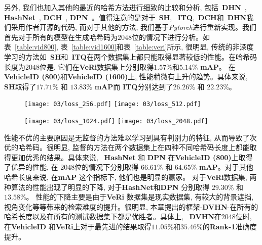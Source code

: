 另外, 我们也加入其他的最近的哈希方法进行细致的比较和分析, 包括~\textbf{DHN}~\cite{zhu2016deep}, \textbf{HashNet}~\cite{cao2017hashnet}, \textbf{DCH}~\cite{cao2018deep}, \textbf{DPN}~\cite{fan2020deep}。值得注意的是对于~\textbf{SH}, ~\textbf{ITQ},~\textbf{DCH}和~\textbf{DHN}我们采用作者开源的代码, 而对于其他的方法, 我们基于\textit{Pytorch}进行重新实现。我们首先对于所有的模型在生成哈希码为$2048$位的情况下进行分析。如表~\ref{table:vid800}, 表~\ref{table:vid1600}和表~\ref{table:veri}所示, 很明显, 传统的非深度学习的方法如~\textbf{SH}和~\textbf{ITQ}在两个数据集上都只能取得显著较低的性能。在哈希码长度为$2048$位是, 它们在\textbf{VeRi}数据集上分别取得$1.57\%$和$5.14\%$ \textbf{mAP}。 在\textbf{VehicleID (800)}和\textbf{VehicleID (1600)}上, 性能稍微有上升的趋势。具体来说, \textbf{SH}取得了$17.71 \%$ 和 $13.83 \%$ \textbf{mAP}而 \textbf{ITQ}分别达到了$26.26 \%$ 和 $22.23\%$。
\begin{figure}[!htp]
    \centering
    \texttt{[image: 03/loss\_256.pdf]}
    \hspace{1cm}
    \texttt{[image: 03/loss\_512.pdf]}
    \label{fig:losscurve}
  \end{figure}

  \begin{figure}[!htp]
    \centering
    \texttt{[image: 03/loss\_1024.pdf]}
    \hspace{1cm}
    \texttt{[image: 03/loss\_2048.pdf]}
    \label{fig:losscurve1}
  \end{figure}


性能不优的主要原因是无监督的方法难以学习到具有判别力的特征, 从而导致了次优的哈希码。很明显, 监督的方法在两个数据集上在四种不同哈希码长度上都能取得更加优秀的结果。具体来说, ~\textbf{HashNet} 和 \textbf{DPN} 在\textbf{VehicleID (800)}上取得了优异的性能, 在 $2048$位的情况下分别取得 $66.61 \%$ 和 $64.65 \%$ \textbf{mAP}。对于其他哈希长度来说, 在\textbf{mAP} 这个指标下, 他们也是明显的赢家。 对于\textbf{VeRi}数据集, 两种算法的性能出现了明显的下降, 对于\textbf{HashNet}和\textbf{DPN} 分别取得 $29.30\%$ 和$13.58\%$。 性能的下降主要是由于\textbf{VeRi} 数据集是现实数据集, 有较大的背景遮挡, 视角变化等等带来的检索难度的提升。很明显, 本章提出的框架-\textbf{DVHN}-在所有的哈希长度以及在所有的测试数据集下都是优胜者。具体上, ~\textbf{DVHN}在$2048$位时, 在\textbf{VehicleID} 和\textbf{VeRi}上对于最先进的结果取得$11.05\%$和$35.46 \%$的\textbf{Rank-1}准确度提升。




